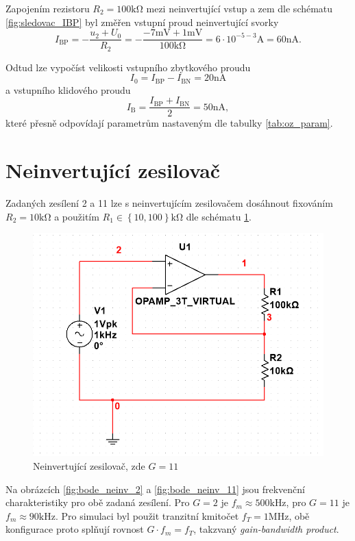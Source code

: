 \documentclass[twoside]{article}
\begin{document}
Zapojením rezistoru $R_2 = 100 \si{\kilo\ohm}$ mezi neinvertující vstup a zem dle schématu \ref{fig:sledovac_IBP}
byl změřen vstupní proud neinvertující svorky
\begin{equation}
    I_\text{BP} = -\frac{u_2 + U_0}{R_2} = -\frac{-7 \si{\milli\volt} + 1 \si{\milli\volt}}{100 \si{\kilo\ohm}}
    = 6 \cdot 10^{-5-3} \si{\ampere} = 60 \si{\nano\ampere}.
\end{equation}

Odtud lze vypočíst velikosti vstupního zbytkového proudu
\begin{equation}
    I_0 = I_\text{BP} - I_\text{BN} = 20 \si{\nano\ampere}
\end{equation}
a vstupního klidového proudu
\begin{equation}
    I_\text{B} = \frac{I_\text{BP} + I_\text{BN}}{2} = 50 \si{\nano\ampere},
\end{equation}
které přesně odpovídají parametrům nastaveným dle tabulky \ref{tab:oz_param}.

\section{Neinvertující zesilovač}

Zadaných zesílení 2 a 11 lze s neinvertujícím zesilovačem dosáhnout
fixováním $R_2 = 10 \si{\kilo\ohm}$ a použitím
$R_1 \in \left\{10, 100\right\} \si{\kilo\ohm}$ dle schématu \ref{fig:neinv_zesilovac}.

\begin{figure}[h!]
    \centering
    \includegraphics[width=0.5\linewidth]{neinv_zesilovac.png}
    \caption{Neinvertující zesilovač, zde $G = 11$}
    \label{fig:neinv_zesilovac}
\end{figure}

Na obrázcích \ref{fig:bode_neinv_2} a \ref{fig:bode_neinv_11} jsou frekvenční charakteristiky pro obě zadaná zesílení.
Pro $G = 2$ je $f_m \approx 500 \si{\kilo\hertz}$, pro $G = 11$ je $f_m \approx 90 \si{\kilo\hertz}$.
Pro simulaci byl použit tranzitní kmitočet $f_T = 1 \si{\mega\hertz}$, obě konfigurace
proto splňují rovnost $G \cdot f_m = f_T$, takzvaný \textit{gain-bandwidth product}.
\end{document}

